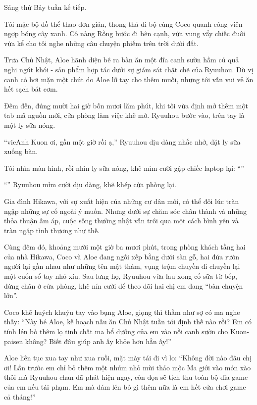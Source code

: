 \documentclass[../main.tex]{subfiles}
\begin{document}
Sáng thứ Bảy tuần kế tiếp.

Tôi mặc bộ đồ thể thao đơn giản, thong thả đi bộ cùng Coco quanh công viên ngợp bóng cây xanh. Cô nàng Rồng bước đi bên cạnh, vừa vung vẩy chiếc đuôi vừa kể cho tôi nghe những câu chuyện phiếm trên trời dưới đất.

Trưa Chủ Nhật, Aloe hãnh diện bê ra bàn ăn một đĩa canh sườn hầm củ quả nghi ngút khói - sản phẩm hợp tác dưới sự giám sát chặt chẽ của Ryuuhou. Dù vị canh có hơi mặn một chút do Aloe lỡ tay cho thêm muối, nhưng tôi vẫn vui vẻ ăn hết sạch bát cơm.

Đêm đến, đúng mười hai giờ bốn mươi lăm phút, khi tôi vừa định mở thêm một tab mã nguồn mới, cửa phòng làm việc khẽ mở. Ryuuhou bước vào, trên tay là một ly sữa nóng.

``vie{Anh Kuon ơi, gần một giờ rồi ạ,}'' Ryuuhou dịu dàng nhắc nhở, đặt ly sữa xuống bàn.

Tôi nhìn màn hình, rồi nhìn ly sữa nóng, khẽ mỉm cười gập chiếc laptop lại: ``''

``'' Ryuuhou mỉm cười dịu dàng, khẽ khép cửa phòng lại.

Gia đình Hikawa, với sự xuất hiện của những cư dân mới, có thể đôi lúc tràn ngập những sự cố ngoài ý muốn. Nhưng dưới sự chăm sóc chân thành và những thỏa thuận ấm áp, cuộc sống thường nhật vẫn trôi qua một cách bình yên và tràn ngập tình thương như thế.

\omk

\pov{-}

Cùng đêm đó, khoảng mười một giờ ba mươi phút, trong phòng khách tầng hai của nhà Hikawa, Coco và Aloe đang ngồi xếp bằng dưới sàn gỗ, hai đứa rướn người lại gần nhau như những tên mật thám, vụng trộm chuyền đi chuyền lại một cuốn sổ tay nhỏ xíu. Sau lưng họ, Ryuuhou vừa lau xong cố sữa từ bếp, dừng chân ở cửa phòng, khẽ nín cười để theo dõi hai chị em đang ``bàn chuyện lớn''.

Coco khẽ huých khuỷu tay vào bụng Aloe, giọng thì thầm như sợ có ma nghe thấy: ``Này bé Aloe, kế hoạch nấu ăn Chủ Nhật tuần tới định thế nào rồi? Em có tính lén bỏ thêm lọ tinh chất ma bổ dưỡng của em vào nồi canh sườn cho Kuon-paisen không? Biết đâu giúp anh ấy khỏe hơn hẳn ấy!''

Aloe liên tục xua tay như xua ruồi, mặt mày tái đi vì lo: ``Không đời nào đâu chị ơi! Lần trước em chỉ bỏ thêm một nhúm nhỏ mùi thảo mộc Ma giới vào món xào thôi mà Ryuuhou-chan đã phát hiện ngay, còn dọa sẽ tịch thu toàn bộ đĩa game của em nếu tái phạm. Em mà dám lén bỏ gì thêm nữa là em hết cửa chơi game cả tháng!''
\end{document}
